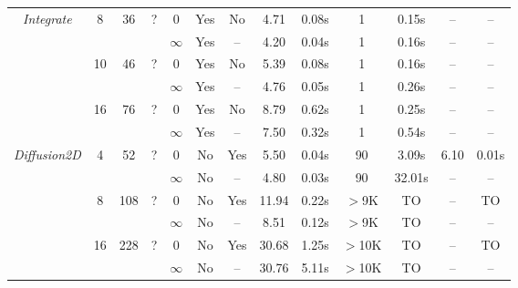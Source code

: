 \begin{savenotes}
\begin{table*}[t]
\begin{center}
\begin{threeparttable}
\begin{tabular}{|c|c|c|c|c|c|c||c|c||c|c||c|c|}
	   \multirow{6}{*}{\textit{Integrate}} & \multirow{2}{*}{8} & \multirow{2}{*}{36} &  \multirow{2}{*}{?} 
          												     & 0 & Yes & No & 4.71 & 0.08s & 1 & 0.15s & --  & -- \tnote{a}\\ \cline{5-13}
          						       &                            & &  &  $\infty$ & Yes & -- & 4.20 & 0.04s & 1 & 0.16s &  -- & --\\ \cline{2-13}
						       		& \multirow{2}{*}{10} & \multirow{2}{*}{46} &  \multirow{2}{*}{?} 
          												     & 0 & Yes & No & 5.39 & 0.08s & 1 & 0.16s & -- & -- \tnote{a}\\ \cline{5-13}
          						       &                            & &  &  $\infty$ & Yes & -- & 4.76 & 0.05s & 1 & 0.26s &  -- & --\\ \cline{2-13}
						              & \multirow{2}{*}{16} & \multirow{2}{*}{76} &  \multirow{2}{*}{?} 
          												     & 0 & Yes & No & 8.79 & 0.62s & 1 & 0.25s & -- & -- \tnote{a}\\ \cline{5-13}
          						       &                            & &  &  $\infty$ & Yes & -- & 7.50 & 0.32s & 1 & 0.54s & --  & --\\ \hline
						       \hline
						       
	    \multirow{6}{*}{\textit{Diffusion2D}} & \multirow{2}{*}{4} & \multirow{2}{*}{52} &  \multirow{2}{*}{?} 
          												     & 0 & No & Yes & 5.50 & 0.04s & 90 & 3.09s & 6.10 & 0.01s\\ \cline{5-13}
          						       &                            & &  &  $\infty$ & No & -- & 4.80 & 0.03s & 90 & 32.01s &  -- & --\\ \cline{2-13}
						       		& \multirow{2}{*}{8} & \multirow{2}{*}{108} &  \multirow{2}{*}{?} 
          												     & 0 & No & Yes & 11.94 & 0.22s & $>$9K & TO & -- & TO\\ \cline{5-13}
          						       &                            & &  &  $\infty$ & No & -- & 8.51 & 0.12s & $>$9K & TO &  -- & --\\ \cline{2-13}
						              & \multirow{2}{*}{16} & \multirow{2}{*}{228} &  \multirow{2}{*}{?} 
          												     & 0 & No & Yes & 30.68 & 1.25s & $>$10K & TO & -- & TO\\ \cline{5-13}
          						       &                            & &  &  $\infty$ & No & -- & 30.76 & 5.11s & $>$10K & TO & --  & --\\ \hline
						       \hline
						       

\end{tabular}
\end{threeparttable}
\end{center}
\end{table*}
\end{savenotes}
